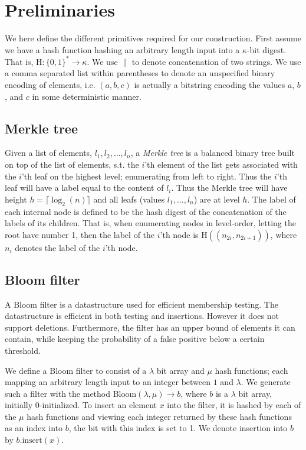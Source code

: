 \documentclass[11pt]{article} %
\newcommand{\Hash}{\ensuremath{\mathrm{H}}}
\newcommand{\Sib}{\ensuremath{\mathrm{Sib}}}
\newcommand{\Bloom}{\ensuremath{\mathrm{Bloom}}}
\renewcommand{\insert}{\ensuremath{\mathrm{insert}}}
\begin{document}
\section{Preliminaries}
We here define the different primitives required for our construction. First assume we have a hash function hashing an arbitrary length input into a $\kappa$-bit digest. That is, $\Hash:\{0,1\}^*\to \kappa$. We use $\|$ to denote concatenation of two strings. We use a comma separated list within parentheses to denote an unspecified binary encoding of elements, i.e. $(a, b, c)$ is actually a bitstring encoding the values $a$, $b$, and $c$ in some deterministic manner. 

\subsection{Merkle tree}
Given a list of elements, $l_1, l_2, \dots, l_n$, a \emph{Merkle tree} is a balanced binary tree built on top of the list of elements, s.t. the $i$'th element of the list gets associated with the $i$'th leaf on the highest level; enumerating from left to right. Thus the $i$'th leaf will have a label equal to the content of $l_i$. Thus the Merkle tree will have height $h=\lceil \log_2(n) \rceil$ and all leafs (values $l_1, \dots, l_n$) are at level $h$. The label of each internal node is defined to be the hash digest of the concatenation of the labels of its children. That is, when enumerating nodes in level-order, letting the root have number 1, then the label of the $i$'th node is $\Hash((n_{2i}, n_{2i+1}))$, where $n_{i}$ denotes the label of the $i$'th node. 


\subsection{Bloom filter}
A Bloom filter is a datastructure used for efficient membership testing. The datastructure is efficient in both testing and insertions. However it does not support deletions. Furthermore, the filter has an upper bound of elements it can contain, while keeping the probability of a false positive below a certain threshold.

We define a Bloom filter to consist of a $\lambda$ bit array and $\mu$ hash functions; each mapping an arbitrary length input to an integer between $1$ and $\lambda$. We generate such a filter with the method $\Bloom(\lambda, \mu)\to b$, where $b$ is a $\lambda$ bit array, initially 0-initialized. To insert an element $x$ into the filter, it is hashed by each of the $\mu$ hash functions and viewing each integer returned by these hash functions as an index into $b$, the bit with this index is set to 1. We denote insertion into $b$ by $b.\insert(x)$. 
\end{document}
